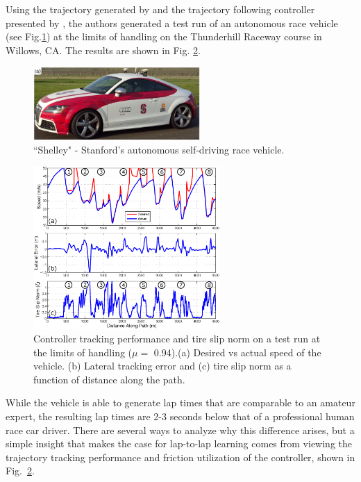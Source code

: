 \documentclass[9pt,shortpaper,twoside,web]{ieeecolor}
\begin{document}
Using the trajectory generated by \cite{kapaniadscc} and the trajectory following controller presented by \cite{kapania}, the
authors generated a test run of an autonomous race vehicle (see Fig.\ref{fig:carpic}) at the limits of handling on the Thunderhill Raceway course in Willows, CA. %
The results are shown in Fig. \ref{fig:expErrors}.

\begin{figure}[h]
\centering
\includegraphics[width=2.5in]{figures/pic1.png}
\caption{``Shelley" - Stanford's autonomous self-driving race vehicle.}
\label{fig:carpic}
\end{figure}

\begin{figure}[h]
\centering
\includegraphics[width=2.8in]{figures/expErrors.eps}
\caption{Controller tracking performance and tire slip norm on a test run at the limits of handling ($\mu =$ 0.94).(a) Desired
vs actual speed of the vehicle. (b) Lateral tracking error and (c) tire slip norm as a function of distance along the path.}
\label{fig:expErrors}
\end{figure}

While the vehicle is able to generate lap times that are comparable to an amateur expert, the resulting lap times are 2-3 seconds below that of a professional human race car driver. There are several ways to analyze why this difference arises, but a simple insight that makes the case for lap-to-lap learning comes from viewing the trajectory tracking performance and friction utilization of the controller, shown in Fig.~\ref{fig:expErrors}. 
\end{document}
